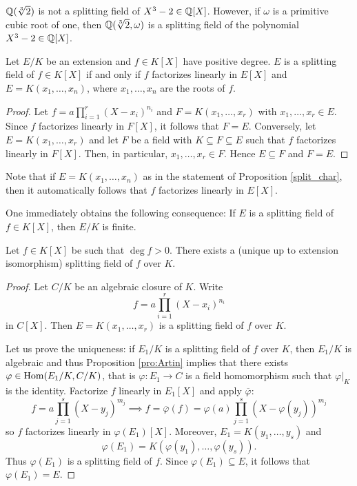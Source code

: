 \begin{example}
	$\mathbb{Q}(\sqrt[3]{2})$ is not a splitting field of $X^3-2\in\mathbb{Q}[X]$. However, if
	$\omega$ is a primitive cubic root of one, then 
	$\mathbb{Q}(\sqrt[3]{2},\omega)$ is a splitting field of the polynomial $X^3-2\in\mathbb{Q}[X]$. 
\end{example}

\begin{proposition} \label{split_char}
    Let $E/K$ be an extension and $f\in K[X]$ have positive degree. 
	$E$ is a splitting field of $f\in K[X]$ if and only if
	$f$ factorizes linearly in $E[X]$ and $E=K(x_1,\dots,x_n)$, where 
	$x_1,\dots,x_n$ are the roots of $f$. 
\end{proposition}

\begin{proof}
    Let $f=a\prod_{i=1}^r(X-x_i)^{n_i}$ and $F=K(x_1,\dots,x_r)$ with $x_1,\dots,x_r\in E$. Since $f$
    factorizes linearly in $F[X]$, it follows that $F=E$. 
    Conversely, let $E=K(x_1,\dots,x_r)$ and
    let $F$ be a field with $K\subseteq F\subseteq E$ such that $f$ factorizes linearly in $F[X]$.
    Then, in particular, $x_1,\dots,x_r\in F$. Hence $E\subseteq F$ and
    $F=E$. 
\end{proof}

Note that if $E=K(x_1,\ldots,x_n)$ as in the statement of Proposition \ref{split_char}, then it automatically follows that $f$ factorizes linearly in $E[X]$.

One immediately obtains the following consequence:
If $E$ is a splitting field of $f\in K[X]$, then $E/K$ is finite. 

\begin{theorem}
    Let $f\in K[X]$ be such that $\deg f>0$. There exists a (unique up to extension isomorphism) 
    splitting field of $f$ over $K$. 
\end{theorem}

\begin{proof}
    Let $C/K$ be an algebraic closure of $K$. Write 
    \[
    f=a\prod_{i=1}^r(X-x_i)^{n_i}
    \]
    in $C[X]$. 
    Then $E=K(x_1,\dots,x_r)$ is a splitting field of $f$ over $K$. 
    
    Let us prove the 
    uniqueness: if $E_1/K$ is a splitting field of $f$ over $K$, 
    then $E_1/K$ is algebraic and thus Proposition
    \ref{pro:Artin} implies that 
    there exists $\varphi\in\operatorname{Hom}(E_1/K,C/K)$, that is $\varphi\colon E_1\to C$ is a field
    homomorphism such that $\varphi|_K$ is the identity.
    Factorize $f$ linearly in $E_1[X]$ and apply $\overline{\varphi}$:
    \[
    f=a\prod_{j=1}^s(X-y_j)^{m_j}
    \implies
    f=\overline{\varphi}(f)=\varphi(a)\prod_{j=1}^s(X-\varphi(y_j))^{m_j}
    \]
    so $f$ factorizes linearly in $\varphi(E_1)[X]$. Moreover, 
    $E_1=K(y_1,\dots,y_s)$ and  
    \[
    \varphi(E_1)=K(\varphi(y_1),\dots,\varphi(y_s)).
    \]
    Thus
    $\varphi(E_1)$ is a splitting field of $f$. Since  
    $\varphi(E_1)\subseteq E$, it follows that $\varphi(E_1)=E$. 
\end{proof}

